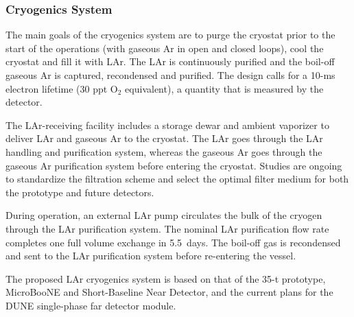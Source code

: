 \subsubsection{Cryogenics System}

The main goals of the cryogenics system are to purge the cryostat
prior to the start of the operations (with gaseous Ar in open and
closed loops), cool the cryostat and fill it with LAr.  The LAr is
continuously purified and the boil-off gaseous Ar is
captured, recondensed and purified.
The design calls for a 10-ms electron lifetime (30 ppt
O$_2$ equivalent), a quantity that is measured by the detector.

The LAr-receiving facility includes a storage dewar and ambient
vaporizer to deliver LAr and gaseous Ar to the cryostat. The LAr goes through
the LAr handling and purification system, whereas the gaseous Ar goes through
the gaseous Ar purification system before entering the cryostat.  Studies are
ongoing to standardize the filtration scheme and select the optimal
filter medium for both the prototype and future detectors.

During operation, an external LAr pump circulates the bulk of the
cryogen through the LAr purification system. The nominal LAr
purification flow rate completes one full volume exchange in 5.5~days.
The boil-off gas is recondensed and sent to the LAr
purification system before re-entering the vessel.

The proposed LAr cryogenics system is based on that of the 35-t
prototype, MicroBooNE and Short-Baseline Near Detector,
and the current plans for the DUNE single-phase far detector module.
